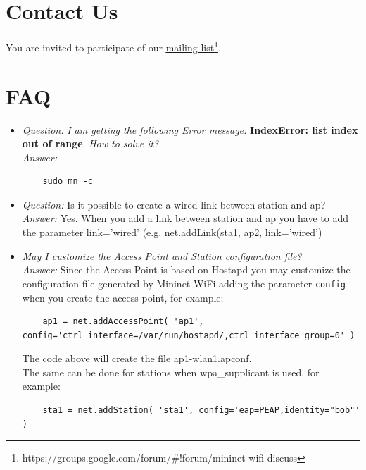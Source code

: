 \section{Contact Us}
You are invited to participate of our \underline{\href{https://groups.google.com/forum/\#!forum/mininet-wifi-discuss}{mailing list}}\footnote{https://groups.google.com/forum/\#!forum/mininet-wifi-discuss}.


\section{FAQ}

\begin{itemize}
\item \textit{Question:} \textit{I am getting the following Error message:} \textbf{IndexError: list index out of range}. \textit{How to solve it?}\\
\textit{Answer:}
\begin{verbatim}
    sudo mn -c
\end{verbatim}
\item \textit{Question:} Is it possible to create a wired link between station and ap?\\
\textit{Answer:} Yes. When you add a link between station and ap you have to add the parameter link='wired' (e.g. net.addLink(sta1, ap2, link='wired')\\

\item \textit{May I customize the Access Point and Station configuration file?}
\\
\textit{Answer:} Since the Access Point is based on Hostapd you may customize the configuration file generated by Mininet-WiFi adding the parameter \texttt{config} when you create the access point, for example:\\

\begin{verbatim}
    ap1 = net.addAccessPoint( 'ap1', config='ctrl_interface=/var/run/hostapd/,ctrl_interface_group=0' )
\end{verbatim}

The code above will create the file ap1-wlan1.apconf. \\

The same can be done for stations when wpa\_supplicant is used, for example:

\begin{verbatim}
    sta1 = net.addStation( 'sta1', config='eap=PEAP,identity="bob"' )
\end{verbatim}



\end{itemize}
